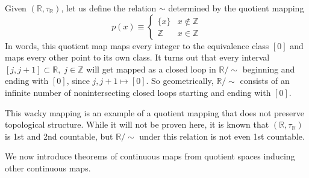     \begin{example}
    Given $(\mathbb{R}, \tau_{\mathbb{R}})$, let us define the relation $\sim$ determined by the quotient mapping
    \[p(x) \equiv \begin{cases}
          \{x\} & x \not\in \mathbb{Z} \\
          \mathbb{Z} & x \in \mathbb{Z}
    \end{cases}\]
    In words, this quotient map maps every integer to the equivalence class $[0]$ and maps every other point to its own class. It turns out that every interval $[j, j+1] \subset \mathbb{R}, \; j \in \mathbb{Z}$ will get mapped as a closed loop in $\mathbb{R} / \sim$ beginning and ending with $[0]$, since $j, j+1 \mapsto [0]$. So geometrically, $\mathbb{R} / \sim$ consists of an infinite number of nonintersecting closed loops starting and ending with $[0]$. 
    \begin{center}
    \end{center}

    This wacky mapping is an example of a quotient mapping that does not preserve topological structure. While it will not be proven here, it is known that $(\mathbb{R}, \tau_{\mathbb{R}})$ is 1st and 2nd countable, but $\mathbb{R} / \sim$ under this relation is not even 1st countable. 
    \end{example}

    We now introduce theorems of continuous maps from quotient spaces inducing other continuous maps. 


